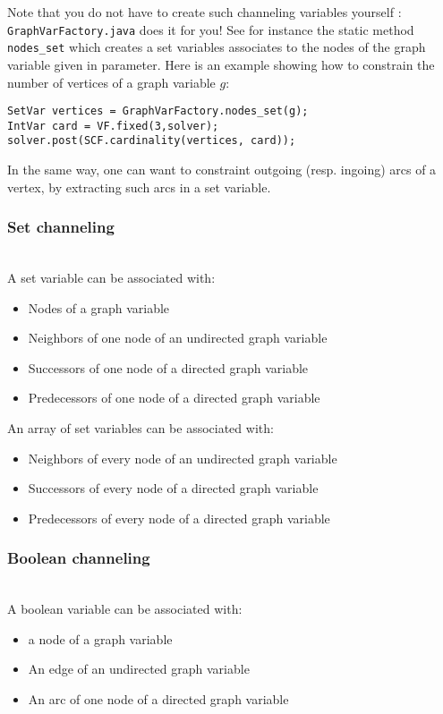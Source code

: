 \documentclass{article}
\begin{document}
Note that you do not have to create such channeling variables yourself : \texttt{GraphVarFactory.java} does it for you! 
See for instance the static method \texttt{nodes\_set} which creates a set variables associates to the nodes of the graph variable given in parameter. 
Here is an example showing how to constrain the number of vertices of a graph variable $g$: 

\begin{lstlisting}
SetVar vertices = GraphVarFactory.nodes_set(g);
IntVar card = VF.fixed(3,solver);
solver.post(SCF.cardinality(vertices, card));
\end{lstlisting}

In the same way, one can want to constraint outgoing (resp. ingoing) arcs of a vertex, by extracting such arcs in a set variable. 

\subsubsection{Set channeling}~\\

A set variable can be associated with: 
\begin{itemize}
\item Nodes of a graph variable
\item Neighbors of one node of an undirected graph variable
\item Successors of one node of a directed graph variable
\item Predecessors of one node of a directed graph variable
\end{itemize}

An array of set variables can be associated with: 
\begin{itemize}
\item Neighbors of every node of an undirected graph variable
\item Successors of every node of a directed graph variable
\item Predecessors of every node of a directed graph variable
\end{itemize}

\subsubsection{Boolean channeling}~\\

A boolean variable can be associated with: 
\begin{itemize}
\item a node of a graph variable
\item An edge of an undirected graph variable
\item An arc of one node of a directed graph variable
\end{itemize}
\end{document}
